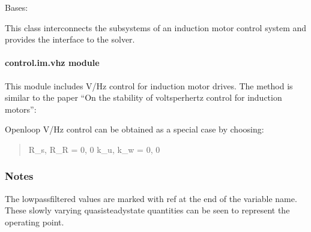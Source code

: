 \documentclass[letterpaper,10pt,english]{sphinxmanual}
\begin{document}

\begin{fulllineitems}
\label{\detokenize{control.im:control.im.vector.VectorCtrl}}
\pysigstartsignatures
{}
\pysigstopsignatures
\sphinxAtStartPar
Bases: 

\sphinxAtStartPar
This class interconnects the subsystems of an induction motor control
system and provides the interface to the solver.

\end{fulllineitems}



\paragraph{control.im.vhz module}
\label{\detokenize{control.im:module-control.im.vhz}}\label{\detokenize{control.im:control-im-vhz-module}}
\sphinxAtStartPar
This module includes V/Hz control for induction motor drives. The method
is similar to the paper “On the stability of volts\sphinxhyphen{}per\sphinxhyphen{}hertz control for
induction motors”:
\begin{quote}

\sphinxAtStartPar
{}
\end{quote}

\sphinxAtStartPar
Open\sphinxhyphen{}loop V/Hz control can be obtained as a special case by choosing:
\begin{quote}

\sphinxAtStartPar
R\_s, R\_R = 0, 0
k\_u, k\_w = 0, 0
\end{quote}
\subsubsection*{Notes}

\sphinxAtStartPar
The low\sphinxhyphen{}pass\sphinxhyphen{}filtered values are marked with ref at the end of the variable
name. These slowly varying quasi\sphinxhyphen{}steady\sphinxhyphen{}state quantities can be seen to
represent the operating point.
\end{document}
